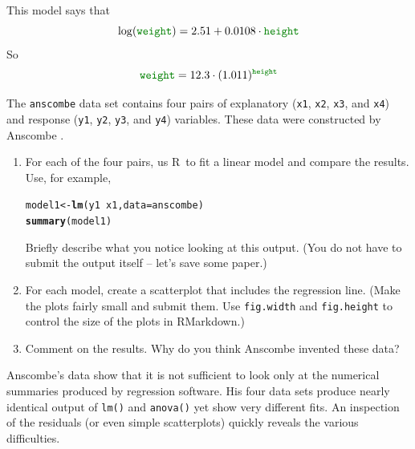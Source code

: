 \documentclass[twoside]{book}\usepackage[]{graphicx}\usepackage[]{xcolor}
\makeatletter
\newcommand{\hlopt}[1]{\textcolor[rgb]{0,0,0}{#1}}%
\newcommand{\hlstd}[1]{\textcolor[rgb]{0.345,0.345,0.345}{#1}}%
\newcommand{\hlkwb}[1]{\textcolor[rgb]{0.69,0.353,0.396}{#1}}%
\newcommand{\hlkwc}[1]{\textcolor[rgb]{0.333,0.667,0.333}{#1}}%
\newcommand{\hlkwd}[1]{\textcolor[rgb]{0.737,0.353,0.396}{\textbf{#1}}}%
\newenvironment{kframe}{%
 \def\at@end@of@kframe{}%
 \ifinner\ifhmode%
  \def\at@end@of@kframe{\end{minipage}}%
  \begin{minipage}{\columnwidth}%
 \fi\fi%
 \def\FrameCommand##1{\hskip\@totalleftmargin \hskip-\fboxsep
 \colorbox{shadecolor}{##1}\hskip-\fboxsep
     \hskip-\linewidth \hskip-\@totalleftmargin \hskip\columnwidth}%
 \MakeFramed {\advance\hsize-\width
   \@totalleftmargin\z@ \linewidth\hsize
   \@setminipage}}%
 {\par\unskip\endMakeFramed%
 \at@end@of@kframe}
\newenvironment{knitrout}{}{} %
\newcommand{\variable}[1]{{\color{green!50!black}\texttt{#1}}}
\newcommand{\Rindex}[1]{\index{\texttt{#1}}}
\newcommand{\dataframe}[1]{{\color{blue!80!black}\texttt{#1}}\Rindex{#1}}
\def\R{{\sf R}}
\newcounter{example}[section]
\makeatother
\begin{document}
\begin{solution}
\begin{enumerate}
\begin{knitrout}
{}



\end{knitrout}
This model says that
\[
\log( \variable{weight} ) 
	= 2.51 + 0.0108 \cdot \variable{height}
\]
So
\[
\variable{weight}  
= 12.3 
		\cdot (1.011)^{\variable{height}}
\]
\end{enumerate}
\end{solution}

\begin{problem}
	The \dataframe{anscombe} data set contains four pairs of explanatory 
	(\variable{x1}, \variable{x2}, \variable{x3}, and \variable{x4})
	and response
	(\variable{y1}, \variable{y2}, \variable{y3}, and \variable{y4})
	variables.  These data were constructed by Anscombe 
	\cite{Anscombe:1973:Graphs}.
	\begin{enumerate}
		\item 
			For each of the four pairs, us \R\ to fit a linear model and 
			compare the results.  Use, for example,
\begin{knitrout}
\color{fgcolor}\begin{kframe}
\begin{alltt}
\hlstd{model1} \hlkwb{<-} \hlkwd{lm}\hlstd{(y1} \hlopt{~} \hlstd{x1,} \hlkwc{data} \hlstd{= anscombe)}
\hlkwd{summary}\hlstd{(model1)}
\end{alltt}
\end{kframe}
\end{knitrout}
			Briefly describe what you notice looking at this output.  (You do not have
			to submit the output itself -- let's save some paper.)
		\item
			For each model, create a scatterplot that includes the regression line.
			(Make the plots fairly small and submit them.
			Use \texttt{fig.width} and \texttt{fig.height} to control the size of 
			the plots in RMarkdown.)
		\item
			Comment on the results.  Why do you think Anscombe invented these data?
	\end{enumerate}
\end{problem}

\begin{solution}
  Anscombe's data show that it is not sufficient to look only at the 
  numerical summaries produced by regression software.  His four data
  sets produce nearly identical output of \verb!lm()! and \verb!anova()!
  yet show very different fits.  An inspection of the residuals (or even
  simple scatterplots) quickly reveals the various difficulties.
\end{solution}
\end{document}
